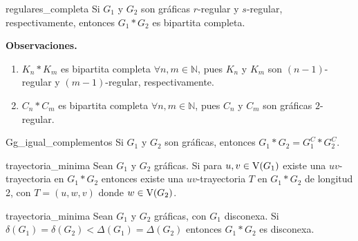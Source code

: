 \documentclass[fleqn, 11pt]{article}
\begin{document}
    \begin{corolario}[beforeafter skip = 4mm]{}{regulares_completa}
        Si $ G_1 $ y $ G_2 $ son gráficas $ r $-regular y $ s $-regular, respectivamente, entonces $ G_1 \ast G_2 $ es bipartita completa.
    \end{corolario}

    \textbf{Observaciones.}

    \begin{enumerate}
        \item $ K_n \ast K_m $ es bipartita completa $ \forall n, m \in \mathbb{N} $, pues $ K_n $ y $ K_m $ son $ (n-1) $-regular y $ (m-1) $-regular, respectivamente.
        \item $ C_n \ast C_m $ es bipartita completa $ \forall n, m \in \mathbb{N} $, pues $ C_n $ y $ C_m $ son gráficas $ 2 $-regular.
    \end{enumerate} \vspace{1mm}

    \begin{teorema}[beforeafter skip = 4mm]{}{Gg_igual_complementos}
        Si $ G_1 $ y $ G_2 $ son gráficas, entonces $ G_1 \ast G_2 = G_1^C \ast G_2^C $.
    \end{teorema}

    \begin{teorema}[beforeafter skip = 4mm]{}{trayectoria_minima}
        Sean $ G_1 $ y $ G_2 $ gráficas. Si para $ u,v \in \textnormal{V}(G_1) $ existe una $ uv $-trayectoria en $ G_1 \ast G_2 $ entonces existe una $ uv $-trayectoria $ T $ en $ G_1 \ast G_2 $ de longitud 2, con $ T = (u,w,v) $ donde $ w \in \textnormal{V}(G_2) $.
    \end{teorema}

    \begin{teorema}[beforeafter skip = 4mm]{}{trayectoria_minima}
        Sean $ G_1 $ y $ G_2 $ gráficas, con $ G_1 $ disconexa. Si $ \delta(G_1) = \delta(G_2) < \Delta(G_1) = \Delta(G_2) $ entonces $ G_1 \ast G_2 $ es disconexa.
    \end{teorema}
\end{document}
